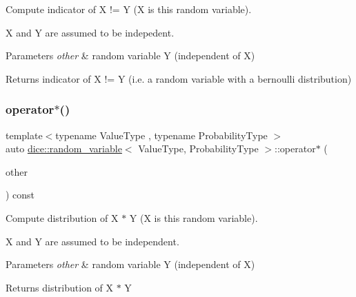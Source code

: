 Compute indicator of X != Y (X is this random variable). 

X and Y are assumed to be indepedent.


\begin{DoxyParams}{Parameters}
{\em other} & random variable Y (independent of X)\\
\hline
\end{DoxyParams}
\begin{DoxyReturn}{Returns}
indicator of X != Y (i.\+e. a random variable with a bernoulli distribution) 
\end{DoxyReturn}
\mbox{\label{classdice_1_1random__variable_ac420c3a819add2d6115dfe5071f40b8e}} 
\subsubsection{\texorpdfstring{operator$\ast$()}{operator*()}}
{\footnotesize\ttfamily template$<$typename Value\+Type , typename Probability\+Type $>$ \\
auto \mbox{\hyperlink{classdice_1_1random__variable}{dice\+::random\+\_\+variable}}$<$ Value\+Type, Probability\+Type $>$\+::operator$\ast$ (\begin{DoxyParamCaption}\item[{const \mbox{\hyperlink{classdice_1_1random__variable}{random\+\_\+variable}}$<$ Value\+Type, Probability\+Type $>$ \&}]{other }\end{DoxyParamCaption}) const\hspace{0.3cm}{\ttfamily [inline]}}



Compute distribution of X $\ast$ Y (X is this random variable). 

X and Y are assumed to be independent.


\begin{DoxyParams}{Parameters}
{\em other} & random variable Y (independent of X)\\
\hline
\end{DoxyParams}
\begin{DoxyReturn}{Returns}
distribution of X $\ast$ Y 
\end{DoxyReturn}
\mbox{\label{classdice_1_1random__variable_a125e2b252af1eb4edd04011f81f080cf}} 
